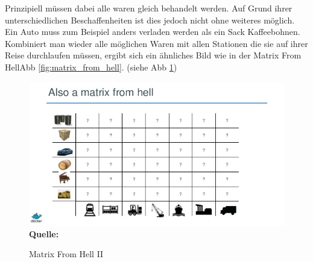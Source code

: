 Prinzipiell müssen dabei alle waren gleich behandelt werden. Auf Grund ihrer unterschiedlichen Beschaffenheiten ist dies jedoch nicht ohne weiteres möglich. Ein Auto muss zum Beispiel anders verladen werden als ein Sack Kaffeebohnen.
Kombiniert man wieder alle möglichen Waren mit allen Stationen die sie auf ihrer Reise durchlaufen müssen, ergibt sich ein ähnliches Bild wie in der \glqq Matrix From Hell\grqq Abb \ref{fig:matrix_from_hell}. (siehe Abb \ref{fig:waren_matrix_from_hell_ii}) 
\begin{figure}[htbp]
  \centering  
  \includegraphics[scale=0.7]{img/waren_matrix_from_hell.jpg}\\
  \footnotesize\sffamily\textbf{Quelle:} \cite{hykes_docker_2013}
  \caption{Matrix From Hell II}
  \label{fig:waren_matrix_from_hell_ii}
\end{figure}

